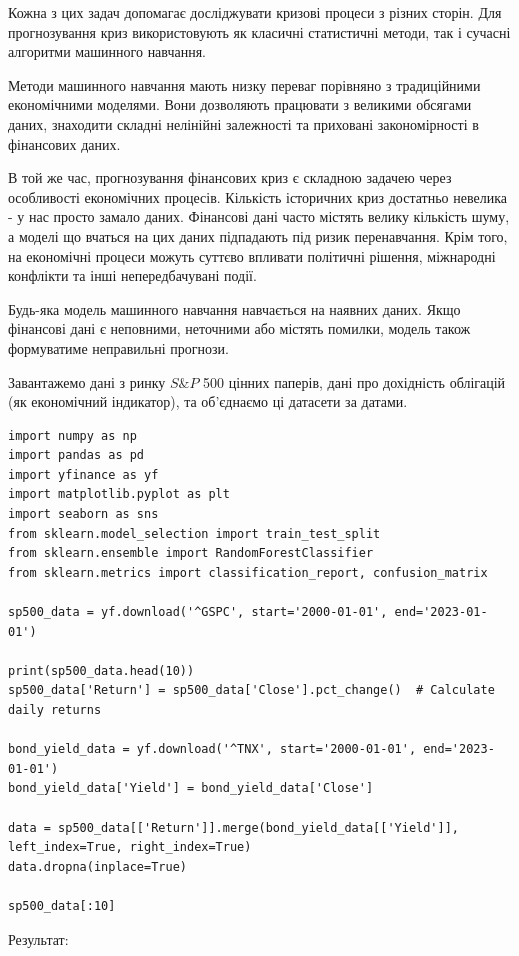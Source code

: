 Кожна з цих задач допомагає досліджувати кризові процеси з різних сторін. Для прогнозування криз використовують як класичні статистичні методи, так і сучасні алгоритми машинного навчання.

Методи машинного навчання мають низку переваг порівняно з традиційними економічними моделями. Вони дозволяють працювати з великими обсягами даних, знаходити складні нелінійні залежності та приховані закономірності в фінансових даних.

В той же час, прогнозування фінансових криз є складною задачею через особливості економічних процесів. Кількість історичних криз достатньо невелика - у нас просто замало даних. Фінансові дані часто містять велику кількість шуму, а моделі що вчаться на цих даних підпадають під ризик перенавчання. Крім того, на економічні процеси можуть суттєво впливати політичні рішення, міжнародні конфлікти та інші непередбачувані події. 

Будь-яка модель машинного навчання навчається на наявних даних. Якщо фінансові дані є неповними, неточними або містять помилки, модель також формуватиме неправильні прогнози.

Завантажемо дані з ринку $S\&P$ 500 цінних паперів, дані про дохідність облігацій (як економічний індикатор), та об'єднаємо ці датасети за датами.

\begin{lstlisting}
import numpy as np
import pandas as pd
import yfinance as yf
import matplotlib.pyplot as plt
import seaborn as sns
from sklearn.model_selection import train_test_split
from sklearn.ensemble import RandomForestClassifier
from sklearn.metrics import classification_report, confusion_matrix

sp500_data = yf.download('^GSPC', start='2000-01-01', end='2023-01-01')

print(sp500_data.head(10))
sp500_data['Return'] = sp500_data['Close'].pct_change()  # Calculate daily returns

bond_yield_data = yf.download('^TNX', start='2000-01-01', end='2023-01-01') 
bond_yield_data['Yield'] = bond_yield_data['Close']

data = sp500_data[['Return']].merge(bond_yield_data[['Yield']], left_index=True, right_index=True)
data.dropna(inplace=True)  

sp500_data[:10]
\end{lstlisting}

Результат:

